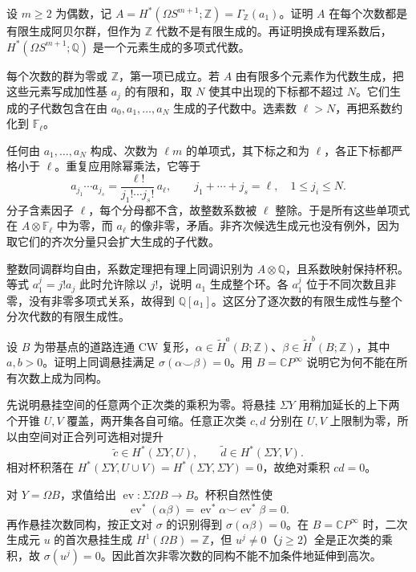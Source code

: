 \begin{exercise}\label{g2:ex:divided-power-finite-generation}
	设 \(m\ge2\) 为偶数，记 \(A=H^*(\Omega S^{m+1};\mathbb Z)=\Gamma_{\mathbb Z}(a_1)\)。证明 \(A\) 在每个次数都是有限生成阿贝尔群，但作为 \(\mathbb Z\) 代数不是有限生成的。再证明换成有理系数后，\(H^*(\Omega S^{m+1};\mathbb Q)\) 是一个元素生成的多项式代数。
\end{exercise}
\begin{solution}
	每个次数的群为零或 \(\mathbb Z\)，第一项已成立。若 \(A\) 由有限多个元素作为代数生成，把这些元素写成加性基 \(a_j\) 的有限和，取 \(N\) 使其中出现的下标都不超过 \(N\)。它们生成的子代数包含在由 \(a_0,a_1,\ldots,a_N\) 生成的子代数中。选素数 \(\ell>N\)，再把系数约化到 \(\mathbb F_\ell\)。

	任何由 \(a_1,\ldots,a_N\) 构成、次数为 \(\ell m\) 的单项式，其下标之和为 \(\ell\)，各正下标都严格小于 \(\ell\)。重复应用除幂乘法，它等于
	\[
		a_{j_1}\cdots a_{j_s}=\frac{\ell!}{j_1!\cdots j_s!}\,a_\ell,
		\qquad j_1+\cdots+j_s=\ell,\quad 1\le j_i\le N.
	\]
	分子含素因子 \(\ell\)，每个分母都不含，故整数系数被 \(\ell\) 整除。于是所有这些单项式在 \(A\otimes\mathbb F_\ell\) 中为零，而 \(a_\ell\) 的像非零，矛盾。非齐次候选生成元也没有例外，因为取它们的齐次分量只会扩大生成的子代数。

	整数同调群均自由，系数定理把有理上同调识别为 \(A\otimes\mathbb Q\)，且系数映射保持杯积。等式 \(a_1^j=j!a_j\) 此时允许除以 \(j!\)，说明 \(a_1\) 生成整个环。各 \(a_1^j\) 位于不同次数且非零，没有非零多项式关系，故得到 \(\mathbb Q[a_1]\)。这区分了逐次数的有限生成性与整个分次代数的有限生成性。
\end{solution}


\begin{exercise}\label{g2:ex:cohomology-suspension-products}
	设 \(B\) 为带基点的道路连通 CW 复形，\(\alpha\in\widetilde H^a(B;\mathbb Z)\)、\(\beta\in\widetilde H^b(B;\mathbb Z)\)，其中 \(a,b>0\)。证明上同调悬挂满足 \(\sigma(\alpha\smile\beta)=0\)。用 \(B=\mathbb CP^\infty\) 说明它为何不能在所有次数上成为同构。
\end{exercise}
\begin{solution}
	先说明悬挂空间的任意两个正次类的乘积为零。将悬挂 \(\Sigma Y\) 用稍加延长的上下两个开锥 \(U,V\) 覆盖，两开集各自可缩。任意正次类 \(c,d\) 分别在 \(U,V\) 上限制为零，所以由空间对正合列可选相对提升
	\[
		\widetilde c\in H^*(\Sigma Y,U),\qquad \widetilde d\in H^*(\Sigma Y,V).
	\]
	相对杯积落在 \(H^*(\Sigma Y,U\cup V)=H^*(\Sigma Y,\Sigma Y)=0\)，故绝对乘积 \(cd=0\)。

	对 \(Y=\Omega B\)，求值给出 \(\operatorname{ev}:\Sigma\Omega B\to B\)。杯积自然性使
	\[
		\operatorname{ev}^*(\alpha\beta)=\operatorname{ev}^*\alpha\smile\operatorname{ev}^*\beta=0.
	\]
	再作悬挂次数同构，按正文对 \(\sigma\) 的识别得到 \(\sigma(\alpha\beta)=0\)。在 \(B=\mathbb CP^\infty\) 时，二次生成元 \(u\) 的首次悬挂生成 \(H^1(\Omega B)=\mathbb Z\)，但 \(u^j\ne0\)（\(j\ge2\)）全是正次类的乘积，故 \(\sigma(u^j)=0\)。因此首次非零次数的同构不能不加条件地延伸到高次。
\end{solution}

